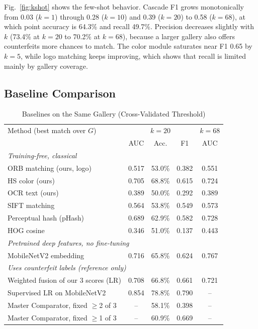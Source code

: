 \documentclass[conference]{IEEEtran}
\begin{document}
Fig.~\ref{fig:kshot} shows the few-shot behavior. Cascade F1 grows
monotonically from 0.03 ($k{=}1$) through 0.28 ($k{=}10$) and 0.39
($k{=}20$) to 0.58 ($k{=}68$), at which point accuracy is 64.3\% and
recall 49.7\%. Precision decreases slightly with $k$ (73.4\% at
$k{=}20$ to 70.2\% at $k{=}68$), because a larger gallery also offers
counterfeits more chances to match. The color module saturates near
F1 0.65 by $k{=}5$, while logo matching keeps improving, which shows that
recall is limited mainly by gallery coverage.

\subsection{Baseline Comparison}
\label{sec:baselines}

\begin{table}[t]
\caption{Baselines on the Same Gallery (Cross-Validated Threshold)}
\label{tab:baselines}
\centering
\setlength{\tabcolsep}{3pt}
\begin{tabular}{lcccc}
\toprule
Method (best match over $G$) & \multicolumn{3}{c}{$k{=}20$} & $k{=}68$ \\
 & AUC & Acc. & F1 & AUC \\
\midrule
\multicolumn{5}{l}{\textit{Training-free, classical}} \\
ORB matching (ours, logo)  & 0.517 & 53.0\% & 0.382 & 0.551 \\
HS color (ours)          & 0.705 & 68.8\% & 0.615 & 0.724 \\
OCR text (ours)           & 0.389 & 50.0\% & 0.292 & 0.389 \\
SIFT matching~\cite{lowe2004} & 0.564 & 53.8\% & 0.549 & 0.573 \\
Perceptual hash (pHash)~\cite{zauner2010} & 0.689 & 62.9\% & 0.582 & 0.728 \\
HOG cosine~\cite{dalal2005} & 0.346 & 51.0\% & 0.137 & 0.443 \\
\midrule
\multicolumn{5}{l}{\textit{Pretrained deep features, no fine-tuning}} \\
MobileNetV2 embedding~\cite{sandler2018} & 0.716 & 65.8\% & 0.624 & 0.767 \\
\midrule
\multicolumn{5}{l}{\textit{Uses counterfeit labels (reference only)}} \\
Weighted fusion of our 3 scores (LR) & 0.708 & 66.8\% & 0.661 & 0.721 \\
Supervised LR on MobileNetV2 & 0.854 & 78.8\% & 0.790 & -- \\
\midrule
Master Comparator, fixed $\geq$2 of 3 & -- & 58.1\% & 0.398 & -- \\
Master Comparator, fixed $\geq$1 of 3 & -- & 60.9\% & 0.669 & -- \\
\bottomrule
\end{tabular}
\end{table}
\end{document}
